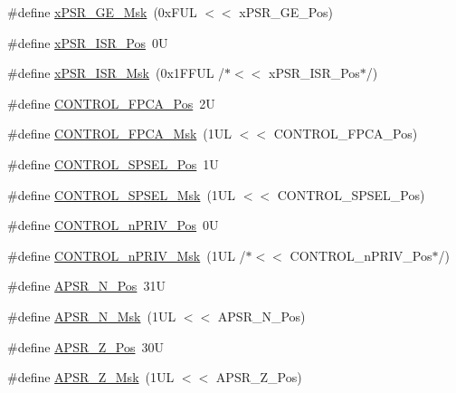 \begin{DoxyCompactItemize}
\item 
\#define \hyperlink{group___c_m_s_i_s___c_o_r_e_ga967634e605d013e9b07002eca31f7903}{x\-P\-S\-R\-\_\-\-G\-E\-\_\-\-Msk}~(0x\-F\-U\-L $<$$<$ x\-P\-S\-R\-\_\-\-G\-E\-\_\-\-Pos)
\item 
\#define \hyperlink{group___c_m_s_i_s___c_o_r_e_ga21bff245fb1aef9683f693d9d7bb2233}{x\-P\-S\-R\-\_\-\-I\-S\-R\-\_\-\-Pos}~0\-U
\item 
\#define \hyperlink{group___c_m_s_i_s___c_o_r_e_gadf8eed87e0081dfe1ef1c78a0ea91afd}{x\-P\-S\-R\-\_\-\-I\-S\-R\-\_\-\-Msk}~(0x1\-F\-F\-U\-L /$\ast$$<$$<$ x\-P\-S\-R\-\_\-\-I\-S\-R\-\_\-\-Pos$\ast$/)
\item 
\#define \hyperlink{group___c_m_s_i_s___c_o_r_e_gac7018b59b07134c5363b33eb94918a58}{C\-O\-N\-T\-R\-O\-L\-\_\-\-F\-P\-C\-A\-\_\-\-Pos}~2\-U
\item 
\#define \hyperlink{group___c_m_s_i_s___c_o_r_e_gad20bb0212b2e1864f24af38d93587c79}{C\-O\-N\-T\-R\-O\-L\-\_\-\-F\-P\-C\-A\-\_\-\-Msk}~(1\-U\-L $<$$<$ C\-O\-N\-T\-R\-O\-L\-\_\-\-F\-P\-C\-A\-\_\-\-Pos)
\item 
\#define \hyperlink{group___c_m_s_i_s___c_o_r_e_ga07eafc53e609895342c6a530e9d01310}{C\-O\-N\-T\-R\-O\-L\-\_\-\-S\-P\-S\-E\-L\-\_\-\-Pos}~1\-U
\item 
\#define \hyperlink{group___c_m_s_i_s___c_o_r_e_ga70b29840969b06909da21369b0b05b53}{C\-O\-N\-T\-R\-O\-L\-\_\-\-S\-P\-S\-E\-L\-\_\-\-Msk}~(1\-U\-L $<$$<$ C\-O\-N\-T\-R\-O\-L\-\_\-\-S\-P\-S\-E\-L\-\_\-\-Pos)
\item 
\#define \hyperlink{group___c_m_s_i_s___c_o_r_e_ga51b95bc03ec0d815b459bde0b14a5908}{C\-O\-N\-T\-R\-O\-L\-\_\-n\-P\-R\-I\-V\-\_\-\-Pos}~0\-U
\item 
\#define \hyperlink{group___c_m_s_i_s___c_o_r_e_gaef3b20d77acb213338f89ce5e7bc36b0}{C\-O\-N\-T\-R\-O\-L\-\_\-n\-P\-R\-I\-V\-\_\-\-Msk}~(1\-U\-L /$\ast$$<$$<$ C\-O\-N\-T\-R\-O\-L\-\_\-n\-P\-R\-I\-V\-\_\-\-Pos$\ast$/)
\item 
\#define \hyperlink{group___c_m_s_i_s___c_o_r_e_gac469528d210043c7bd3f12f0e6824766}{A\-P\-S\-R\-\_\-\-N\-\_\-\-Pos}~31\-U
\item 
\#define \hyperlink{group___c_m_s_i_s___c_o_r_e_gadbc2cf55a026f661b53fadfcf822cef1}{A\-P\-S\-R\-\_\-\-N\-\_\-\-Msk}~(1\-U\-L $<$$<$ A\-P\-S\-R\-\_\-\-N\-\_\-\-Pos)
\item 
\#define \hyperlink{group___c_m_s_i_s___c_o_r_e_ga3661286d108b1aca308d7445685eae3a}{A\-P\-S\-R\-\_\-\-Z\-\_\-\-Pos}~30\-U
\item 
\#define \hyperlink{group___c_m_s_i_s___c_o_r_e_ga1deb4d1aa72bb83d1f79329406f15711}{A\-P\-S\-R\-\_\-\-Z\-\_\-\-Msk}~(1\-U\-L $<$$<$ A\-P\-S\-R\-\_\-\-Z\-\_\-\-Pos)
$$
\end{DoxyCompactItemize}
